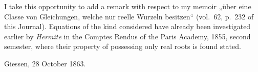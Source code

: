 \documentclass{article}
\begin{document}
I take this opportunity to add a remark with respect to my memoir „über eine Classe von Gleichungen, welche nur reelle Wurzeln besitzen“ (vol.\ 62, p.\ 232 of this Journal). Equations of the kind considered have already been investigated earlier by \emph{Hermite} in the Comptes Rendus of the Paris Academy, 1855, second semester, where their property of possessing only real roots is found stated.

Giessen, 28 October 1863.
\end{document}
